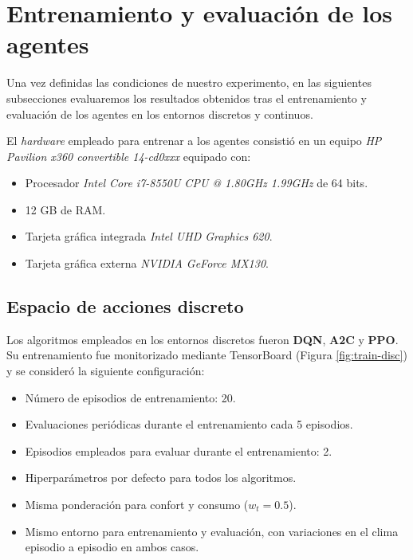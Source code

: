 \section{Entrenamiento y evaluación de los agentes}
\label{sec:evaluacion-agentes}

Una vez definidas las condiciones de nuestro experimento, en las siguientes subsecciones evaluaremos los resultados obtenidos tras el entrenamiento y evaluación de los agentes en los entornos discretos y continuos.

El \textit{hardware} empleado para entrenar a los agentes consistió en un equipo \textit{HP Pavilion x360 convertible 14-cd0xxx} equipado con:

\begin{itemize}
    \item Procesador \textit{Intel Core i7-8550U CPU @ 1.80GHz 1.99GHz} de 64 bits.
    \item 12 GB de RAM.
    \item Tarjeta gráfica integrada \textit{Intel UHD Graphics 620}.
    \item Tarjeta gráfica externa \textit{NVIDIA GeForce MX130}.
\end{itemize}

\FloatBarrier
\subsection{Espacio de acciones discreto}

Los algoritmos empleados en los entornos discretos fueron \textbf{DQN}, \textbf{A2C} y \textbf{PPO}. Su entrenamiento fue monitorizado mediante TensorBoard (Figura \ref{fig:train-disc}) y se consideró la siguiente configuración:

\begin{itemize}
    \item Número de episodios de entrenamiento: 20.
    \item Evaluaciones periódicas durante el entrenamiento cada 5 episodios.
    \item Episodios empleados para evaluar durante el entrenamiento: 2.
    \item Hiperparámetros por defecto para todos los algoritmos.
    \item Misma ponderación para confort y consumo ($w_t = 0.5$).
    \item Mismo entorno para entrenamiento y evaluación, con variaciones en el clima episodio a episodio en ambos casos.
\end{itemize}

